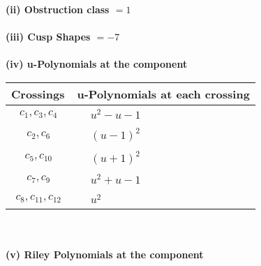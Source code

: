\documentclass[1p]{elsarticle_modified}
\theoremstyle{definition}
\begin{document}
\flushleft \textbf{(ii) Obstruction class $= 1$}\\~\\
\flushleft \textbf{(iii) Cusp Shapes $= -7$}\\~\\
\newpage\renewcommand{\arraystretch}{1}
\flushleft \textbf{(iv) u-Polynomials at the component}\newline \\
\begin{tabular}{m{50pt}|m{274pt}}
Crossings & \hspace{64pt}u-Polynomials at each crossing \\
\hline $$\begin{aligned}c_{1},c_{3},c_{4}\end{aligned}$$&$\begin{aligned}
&u^2- u-1
\end{aligned}$\\
\hline $$\begin{aligned}c_{2},c_{6}\end{aligned}$$&$\begin{aligned}
&(u-1)^2
\end{aligned}$\\
\hline $$\begin{aligned}c_{5},c_{10}\end{aligned}$$&$\begin{aligned}
&(u+1)^2
\end{aligned}$\\
\hline $$\begin{aligned}c_{7},c_{9}\end{aligned}$$&$\begin{aligned}
&u^2+u-1
\end{aligned}$\\
\hline $$\begin{aligned}c_{8},c_{11},c_{12}\end{aligned}$$&$\begin{aligned}
&u^2
\end{aligned}$\\
\hline
\end{tabular}\\~\\
\newpage\renewcommand{\arraystretch}{1}
\flushleft \textbf{(v) Riley Polynomials at the component}\newline \\
\end{document}
